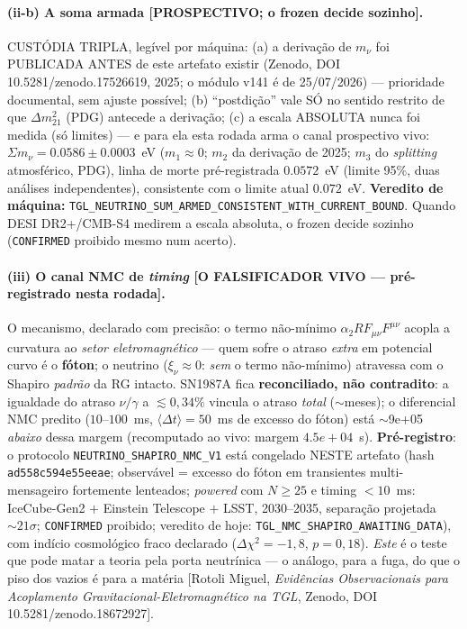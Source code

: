 \documentclass[11pt]{article}
\theoremstyle{definition}\newtheorem{deriv}{Derivação}
\begin{document}
\paragraph{(ii-b) A soma armada \textsf{[PROSPECTIVO; o frozen decide sozinho].}} CUSTÓDIA TRIPLA, legível por máquina: (a) a derivação de $m_\nu$ foi PUBLICADA ANTES de este artefato existir (Zenodo, DOI 10.5281/zenodo.17526619, 2025; o módulo v141 é de 25/07/2026) --- prioridade documental, sem ajuste possível; (b) ``postdição'' vale SÓ no sentido restrito de que $\Delta m^2_{21}$ (PDG) antecede a derivação; (c) a escala ABSOLUTA nunca foi medida (só limites) --- e para ela esta rodada arma o canal prospectivo vivo: $\Sigma m_\nu = 0.0586 \pm 0.0003$~eV ($m_1\!\approx\!0$; $m_2$ da derivação de 2025; $m_3$ do \emph{splitting} atmosférico, PDG), linha de morte pré-registrada $0.0572$~eV (limite 95\%, duas análises independentes), consistente com o limite atual $0.072$~eV. \textbf{Veredito de máquina:} \texttt{TGL\_NEUTRINO\_SUM\_ARMED\_CONSISTENT\_WITH\_CURRENT\_BOUND}. Quando DESI DR2+/CMB-S4 medirem a escala absoluta, o frozen decide sozinho (\texttt{CONFIRMED} proibido mesmo num acerto).

\paragraph{(iii) O canal NMC de \emph{timing} \textsf{[O FALSIFICADOR VIVO --- pré-registrado nesta rodada].}} O mecanismo, declarado com precisão: o termo não-mínimo $\alpha_2 R F_{\mu\nu}F^{\mu\nu}$ \cite{rotolinmc2026} acopla a curvatura ao \emph{setor eletromagnético} --- quem sofre o atraso \emph{extra} em potencial curvo é o \textbf{fóton}; o neutrino ($\xi_\nu\approx0$: \emph{sem} o termo não-mínimo) atravessa com o Shapiro \emph{padrão} da RG intacto. SN1987A fica \textbf{reconciliado, não contradito}: a igualdade do atraso $\nu/\gamma$ a $\lesssim0{,}34\%$ \cite{longo1988,krauss1988} vincula o atraso \emph{total} ($\sim$meses); o diferencial NMC predito ($10$--$100$~ms, $\langle\Delta t\rangle=50$~ms de excesso do fóton) está $\sim$9e+05 \emph{abaixo} dessa margem (recomputado ao vivo: margem $4.5e+04$~s). \textbf{Pré-registro}: o protocolo \texttt{NEUTRINO\_SHAPIRO\_NMC\_V1} está congelado NESTE artefato (hash \texttt{ad558c594e55eeae}; observável = excesso do fóton em transientes multi-mensageiro fortemente lenteados; \emph{powered} com $N\geq25$ e timing $<10$~ms: IceCube-Gen2 $+$ Einstein Telescope $+$ LSST, 2030--2035, separação projetada $\sim21\sigma$; \texttt{CONFIRMED} proibido; veredito de hoje: \texttt{TGL\_NMC\_SHAPIRO\_AWAITING\_DATA}), com indício cosmológico fraco declarado ($\Delta\chi^2=-1{,}8$, $p=0{,}18$). \emph{Este} é o teste que pode matar a teoria pela porta neutrínica --- o análogo, para a fuga, do que o piso dos vazios é para a matéria [Rotoli Miguel, \emph{Evidências Observacionais para Acoplamento Gravitacional-Eletromagnético na TGL}, Zenodo, DOI 10.5281/zenodo.18672927].
\end{document}
